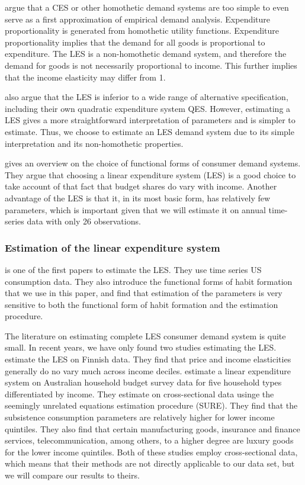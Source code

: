 \citet[p. 24]{pollak1992demand} argue that a CES or other homothetic demand systems are too simple to even serve as a first approximation of empirical demand analysis. Expenditure proportionality is generated from homothetic utility functions. Expenditure proportionality implies that the demand for all goods is proportional to expenditure. The LES is a non-homothetic demand system, and therefore the demand for goods is not necessarily proportional to income. This further implies that the income elasticity may differ from 1. 

\cite{pollak1992demand} also argue that the LES is inferior to a wide range of alternative specification, including their own quadratic expenditure system QES. However, estimating a LES gives a more straightforward interpretation of parameters and is simpler to estimate.
Thus, we choose to estimate an LES demand system due to its simple interpretation and its non-homothetic properties. 

\cite{annabi2006functional} gives an overview on the choice of functional forms of consumer demand systems. They argue that choosing a linear expenditure system (LES) is a good choice to take account of that fact that budget shares do vary with income. Another advantage of the LES is that it, in its most basic form, has relatively few parameters, which is important given that we will estimate it on annual time-series data with only 26 observations. 



\subsubsection{Estimation of the linear expenditure system}
\cite{pollak1969estimation} is one of the first papers to estimate the LES. They use time series US consumption data. They also introduce the functional forms of habit formation that we use in this paper, and find that estimation of the parameters is very sensitive to both the functional form of habit formation and the estimation procedure. 

The literature on estimating complete LES consumer demand system is quite small. In recent years, we have only found two studies estimating the LES. \cite{jussila2012estimation} estimate the LES on Finnish data. They find that price and income elasticities generally do no vary much across income deciles. \cite{gharibnavaz2018estimating} estimate a linear expenditure system on Australian household budget survey data for five household types differentiated by income. They estimate on cross-sectional data usinge the seemingly unrelated equations estimation procedure (SURE). They find that the subsistence consumption parameters are relatively higher for lower income quintiles. They also find that certain manufacturing goods, insurance and finance services, telecommunication, among others, to a higher degree are luxury goods for the lower income quintiles. Both of these studies employ cross-sectional data, which means that their methods are not directly applicable to our data set, but we will compare our results to theirs.

